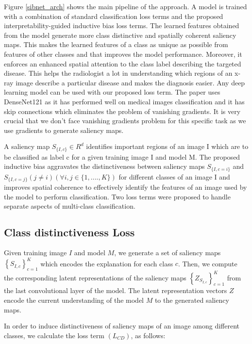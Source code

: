 Figure \ref{sibnet_arch} shows the main pipeline of the approach. A model is trained with a combination of standard classification loss terms and the proposed interpretability-guided inductive bias loss terms. The learned features obtained from the model generate more class distinctive and spatially coherent saliency maps. This makes the learned features of a class as unique as possible from features of other classes and that improves the model performance. Moreover, it enforces an enhanced spatial attention to the class label describing the targeted disease. This helps the radiologist a lot in understanding which regions of an x-ray image describe a particular disease and makes the diagnosis easier. Any deep learning model can be used with our proposed loss term. The paper uses DenseNet121 as it has performed well on medical images classification and it has skip connections which eliminates the problem of vanishing gradients. It is very crucial that we don’t face vanishing gradients problem for this specific task as we use gradients to generate saliency maps.

A saliency map \textbf{$S_{\{I,c\}} \in R^d$}
identifies important regions of an image I which are to
be classified as label c for a given training image I and model M. The proposed
inductive bias aggravates the distinctiveness between saliency maps \textbf{$S_{\{I,c=i\}}$} and \textbf{$S_{\{I,c=j\}} (j \ne i) (\forall i, j \in \{1, ...., K\})$} for different classes of an image I and improves spatial coherence to effectively identify the features of an image used by the model
to perform classification. Two loss terms were proposed to handle separate aspects of multi-class classification.

\subsection{Class distinctiveness Loss}

Given training image $I$ and model $M$, we generate a set of saliency maps $\left\{S_{I, c}\right\}_{c=1}^{K}$ which encodes the explanation for each class $c$. Then, we compute the corresponding latent representations of the saliency maps $\left\{Z_{S_{I, c}}\right\}_{c=1}^{K}$ from the last convolutional layer of the model. The latent representation vectors $Z$ encode the current understanding of the model $M$ to the generated saliency maps.

In order to induce distinctiveness of saliency maps of an image among different classes, we calculate the loss term $\left(L_{C D}\right)$, as follows:

